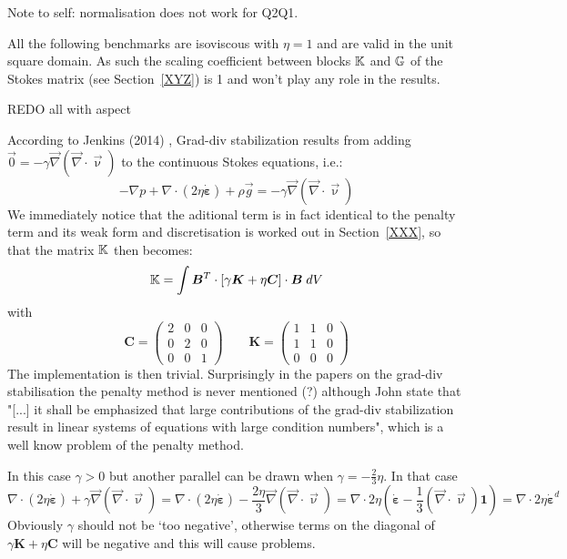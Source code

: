 
Note to self: normalisation does not work for Q2Q1.

All the following benchmarks are isoviscous with $\eta=1$ and are valid in the unit square domain. 
As such the scaling coefficient between blocks ${\mathbb{K}}$ and ${\mathbb{G}}$ of the Stokes matrix (see Section~\ref{XYZ}) 
is 1 and won't play any role in the results. 

REDO all with aspect

According to Jenkins \etal (2014) \cite{jejl14}, Grad-div stabilization results from adding
$\vec{0} = - \gamma \vec\nabla (\vec\nabla\cdot \vec\upnu)$ to the continuous Stokes
equations, i.e.:
\[
-\nabla p  + \nabla \cdot ( 2 \eta \dot{\bm \varepsilon}) + \rho \vec{g} 
= - \gamma \vec\nabla (\vec\nabla\cdot \vec\upnu)
\]
We immediately notice that the aditional term is in fact identical to the penalty term and 
its weak form and discretisation is worked out in Section~\ref{XXX}, so that 
the matrix ${\mathbb{K}}$ then becomes:
\[
{\mathbb{K}} = \int {\bm B}^T \cdot [ \gamma {\bm K} + \eta {\bm C} ] \cdot {\bm B} \; dV
\]
with 
\[
{\bm C}=
\left(
\begin{array}{ccc}
2 & 0 & 0 \\
0 & 2 & 0 \\
0 & 0 & 1 
\end{array}
\right)
\qquad
{\bm K}=
\left(
\begin{array}{ccc}
1 & 1 & 0 \\
1 & 1 & 0 \\
0 & 0 & 0 
\end{array}
\right)
\]
The implementation is then trivial. Surprisingly in the papers on the grad-div stabilisation 
the penalty method is never mentioned (?) although John \etal state that 
"[...] it shall be emphasized that large
contributions of the grad-div stabilization result in linear systems of equations with
large condition numbers", which is a well know problem of the penalty method.

In this case $\gamma>0$ but another parallel can be drawn when $\gamma = -\frac{2}{3}\eta$. In that case
\[
 \nabla \cdot ( 2 \eta \dot{\bm \varepsilon}) + \gamma \vec\nabla (\vec\nabla\cdot \vec\upnu)
=
 \nabla \cdot ( 2 \eta \dot{\bm \varepsilon}) -\frac{2\eta}{3} \vec\nabla (\vec\nabla\cdot \vec\upnu)
=
 \nabla \cdot 2 \eta ( \dot{\bm \varepsilon} -\frac{1}{3} (\vec\nabla\cdot \vec\upnu) {\bm 1} )
= 
 \nabla \cdot 2 \eta \dot{\bm \varepsilon}^d 
\]
Obviously $\gamma$ should not be `too negative', otherwise terms on the diagonal 
of $\gamma {\bm K} + \eta {\bm C} $
will be negative and this will cause problems. 

